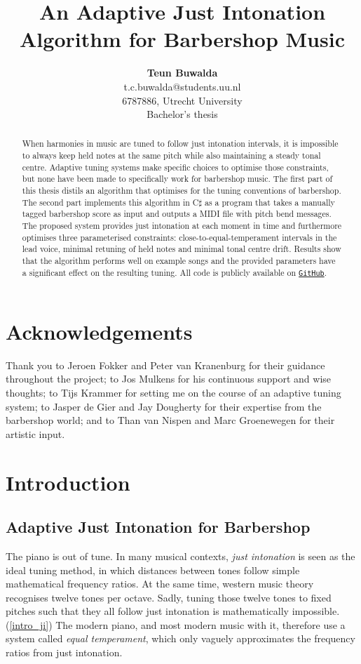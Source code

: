 \documentclass[a4paper]{article}
\title{An Adaptive Just Intonation Algorithm for Barbershop Music}
\author{{\bf Teun Buwalda}\\t.c.buwalda@students.uu.nl\\6787886, Utrecht University\\Bachelor's thesis}
\begin{document}
\maketitle

\begin{abstract}
	When harmonies in music are tuned to follow just intonation intervals, it is impossible to always keep held notes at the same pitch while also maintaining a steady tonal centre. Adaptive tuning systems make specific choices to optimise those constraints, but none have been made to specifically work for barbershop music. The first part of this thesis distils an algorithm that optimises for the tuning conventions of barbershop. The second part implements this algorithm in C$\sharp$ as a program that takes a manually tagged barbershop score as input and outputs a MIDI file with pitch bend messages. The proposed system provides just intonation at each moment in time and furthermore optimises three parameterised constraints: close-to-equal-temperament intervals in the lead voice, minimal retuning of held notes and minimal tonal centre drift. Results show that the algorithm performs well on example songs and the provided parameters have a significant effect on the resulting tuning. All code is publicly available on \texttt{\href{https://GitHub.com/teuncb/AdaptiveBarbershop}{GitHub}}.
\end{abstract}

\section*{Acknowledgements}
Thank you to Jeroen Fokker and Peter van Kranenburg for their guidance throughout the project; to Jos Mulkens for his continuous support and wise thoughts; to Tijs Krammer for setting me on the course of an adaptive tuning system; to Jasper de Gier and Jay Dougherty for their expertise from the barbershop world; and to Than van Nispen and Marc Groenewegen for their artistic input.

\pagebreak

\section{Introduction}
\subsection{Adaptive Just Intonation for Barbershop}
The piano is out of tune. In many musical contexts, \textit{just intonation} is seen as the ideal tuning method, in which distances between tones follow simple mathematical frequency ratios. \cite{boyden_prelleur_1951, fonville_ben_1991} At the same time, western music theory recognises twelve tones per octave. \cite{persichetti_twentieth-century_1961} Sadly, tuning those twelve tones to fixed pitches such that they all follow just intonation is mathematically impossible. (\ref{intro_ji}) The modern piano, and most modern music with it, therefore use a system called \textit{equal temperament}, which only vaguely approximates the frequency ratios from just intonation. \cite{van_de_craats_fis_1989}
\end{document}
